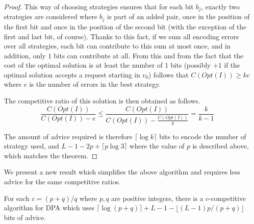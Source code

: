 \begin{proof}
    This way of choosing strategies ensures that for each bit $b_j$,
    exactly two strategies are considered where $b_j$ is part of an added
    pair, once in the position of the first bit and once in the position
    of the second bit (with the exception of the first and last bit, of
    course). Thanks to this fact, if we sum all encoding errors over all
    strategies, each bit can contribute to this sum at most once, and in
    addition, only $1$ bits can contribute at all. From this and from the
    fact that the cost of the optimal solution is at least the number of
    $1$ bits (possibly $+1$ if the optimal solution accepts a request
    starting in $v_0$) follows that $C(Opt(I)) \geq ke$ where $e$ is the
    number of errors in the best strategy.

    The competitive ratio of this solution is then obtained as follows.
    $$
        \frac{C(Opt(I))}{C(Opt(I)) - e} \leq \frac{C(Opt(I))}{C(Opt(I)) -
        \frac{C(Opt(I))}{k}} = \frac{k}{k-1}
    $$

    The amount of advice required is therefore $\lceil\log{}k\rceil$ bits
    to encode the number of strategy used, and $L - 1 - 2p +
    \lceil{}p\log{}3\rceil$ where the value of $p$ is described above,
    which matches the theorem.
\end{proof}

We present a new result which simplifies the above algorithm and requires
less advice for the same competitive ratios.

\begin{theorem}\label{theorem:dpa-fraction}
    For each $c = (p+q)/q$ where $p, q$ are positive integers, there is a
    $c$-competitive algorithm for DPA which uses $\lceil\log(p+q)\rceil +
    L - 1 - \lfloor (L-1) p / (p + q)\rfloor$ bits of advice.
\end{theorem}

